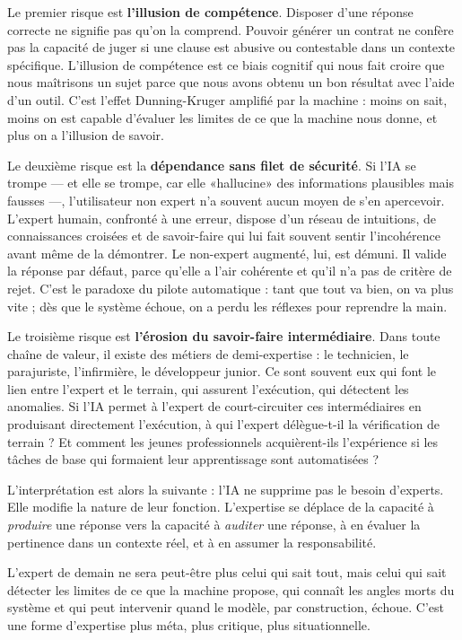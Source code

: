 Le premier risque est \textbf{l'illusion de compétence}. Disposer d'une réponse correcte ne signifie pas qu'on la comprend. Pouvoir générer un contrat ne confère pas la capacité de juger si une clause est abusive ou contestable dans un contexte spécifique. L'illusion de compétence est ce biais cognitif qui nous fait croire que nous maîtrisons un sujet parce que nous avons obtenu un bon résultat avec l'aide d'un outil. C'est l'effet Dunning-Kruger amplifié par la machine : moins on sait, moins on est capable d'évaluer les limites de ce que la machine nous donne, et plus on a l'illusion de savoir.

Le deuxième risque est la \textbf{dépendance sans filet de sécurité}. Si l'IA se trompe — et elle se trompe, car elle «hallucine» des informations plausibles mais fausses —, l'utilisateur non expert n'a souvent aucun moyen de s'en apercevoir. L'expert humain, confronté à une erreur, dispose d'un réseau de intuitions, de connaissances croisées et de savoir-faire qui lui fait souvent sentir l'incohérence avant même de la démontrer. Le non-expert augmenté, lui, est démuni. Il valide la réponse par défaut, parce qu'elle a l'air cohérente et qu'il n'a pas de critère de rejet. C'est le paradoxe du pilote automatique : tant que tout va bien, on va plus vite ; dès que le système échoue, on a perdu les réflexes pour reprendre la main.

Le troisième risque est \textbf{l'érosion du savoir-faire intermédiaire}. Dans toute chaîne de valeur, il existe des métiers de demi-expertise : le technicien, le parajuriste, l'infirmière, le développeur junior. Ce sont souvent eux qui font le lien entre l'expert et le terrain, qui assurent l'exécution, qui détectent les anomalies. Si l'IA permet à l'expert de court-circuiter ces intermédiaires en produisant directement l'exécution, à qui l'expert délègue-t-il la vérification de terrain ? Et comment les jeunes professionnels acquièrent-ils l'expérience si les tâches de base qui formaient leur apprentissage sont automatisées ?

L'interprétation est alors la suivante : l'IA ne supprime pas le besoin d'experts. Elle modifie la nature de leur fonction. L'expertise se déplace de la capacité à \emph{produire} une réponse vers la capacité à \emph{auditer} une réponse, à en évaluer la pertinence dans un contexte réel, et à en assumer la responsabilité.

L'expert de demain ne sera peut-être plus celui qui sait tout, mais celui qui sait détecter les limites de ce que la machine propose, qui connaît les angles morts du système et qui peut intervenir quand le modèle, par construction, échoue. C'est une forme d'expertise plus méta, plus critique, plus situationnelle.

